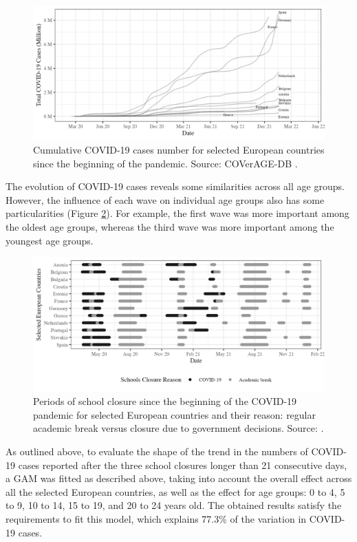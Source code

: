 \documentclass[]{interact}
\theoremstyle{plain}%
\theoremstyle{definition}
\theoremstyle{remark}
\begin{document}
\begin{figure}
\includegraphics[width=\textwidth]{manuscript_files/figure-latex/overall-1} \caption{Cumulative COVID-19 cases number for selected European countries since the beginning of the pandemic. Source: COVerAGE-DB \citep{riffe2021data}.}\label{fig:overall}
\end{figure}

The evolution of COVID-19 cases reveals some similarities across all age groups. However, the influence of each wave on individual age groups also has some particularities (Figure \ref{fig:descriptive}). For example, the first wave was more important among the oldest age groups, whereas the third wave was more important among the youngest age groups.

\begin{figure}
\includegraphics[width=\textwidth]{manuscript_files/figure-latex/descriptive-1} \caption{Periods of school closure since the beginning of the COVID-19 pandemic for selected European countries and their reason: regular academic break versus closure due to government decisions. Source: \citet{unesco2022https}.}\label{fig:descriptive}
\end{figure}

As outlined above, to evaluate the shape of the trend in the numbers of COVID-19 cases reported after the three school closures longer than 21 consecutive days, a GAM was fitted as described above, taking into account the overall effect across all the selected European countries, as well as the effect for age groups: 0 to 4, 5 to 9, 10 to 14, 15 to 19, and 20 to 24 years old. The obtained results satisfy the requirements to fit this model, which explains 77.3\% of the variation in COVID-19 cases.
\end{document}
